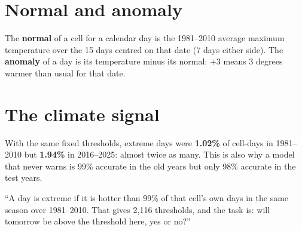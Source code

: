 \section{Normal and anomaly}
The \textbf{normal} of a cell for a calendar day is the 1981--2010 average maximum temperature over the 15 days centred
on that date (7 days either side). The \textbf{anomaly} of a day is its temperature minus its normal: $+3$ means 3
degrees warmer than usual for that date.

\section{The climate signal}
With the same fixed thresholds, extreme days were \textbf{1.02\%} of cell-days in 1981--2010 but \textbf{1.94\%} in
2016--2025: almost twice as many. This is also why a model that never warns is 99\% accurate in the old years but only
98\% accurate in the test years.

\begin{sayit}
``A day is extreme if it is hotter than 99\% of that cell's own days in the same season over 1981--2010. That gives
2,116 thresholds, and the task is: will tomorrow be above the threshold here, yes or no?''
\end{sayit}

